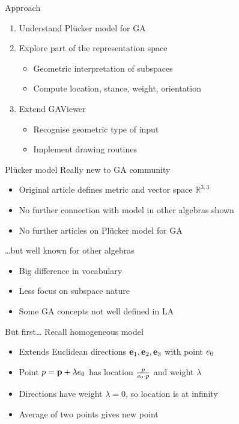\documentclass{beamer}
\begin{document}
\begin{frame}{Approach}
  \begin{enumerate}
    \item Understand Pl\"ucker model for GA
    \item Explore part of the representation space
      \begin{itemize}
        \item Geometric interpretation of subspaces
        \item Compute location, stance, weight, orientation
      \end{itemize}
    \item Extend GAViewer
      \begin{itemize}
        \item Recognise geometric type of input
        \item Implement drawing routines
      \end{itemize}
  \end{enumerate}
\end{frame}

\begin{frame}{Pl\"ucker model}
  Really new to GA community
  \begin{itemize}
    \item Original article defines metric and vector space $\mathbb{R}^{3,3}$
    \item No further connection with model in other algebras shown
    \item No further articles on Pl\"ucker model for GA
  \end{itemize}
  \bigskip 
  \ldots but well known for other algebras
  \begin{itemize}
    \item Big difference in vocabulary
    \item Less focus on subspace nature
    \item Some GA concepts not well defined in LA
  \end{itemize}
\end{frame}

\begin{frame}{But first\ldots}
  Recall homogeneous model
  \begin{itemize}
    \item Extends Euclidean directions $\mathbf{e}_1, \mathbf{e}_2, \mathbf{e}_3$ with point $e_0$
    \item Point $p = \mathbf{p} + \lambda e_0$ has location $\frac{p}{e_0 \mathbin{\cdot} p}$ and weight $\lambda$
    \item Directions have weight $\lambda = 0$, so location is at infinity
    \item Average of two points gives new point
  \end{itemize}
\end{frame}
\end{document}
